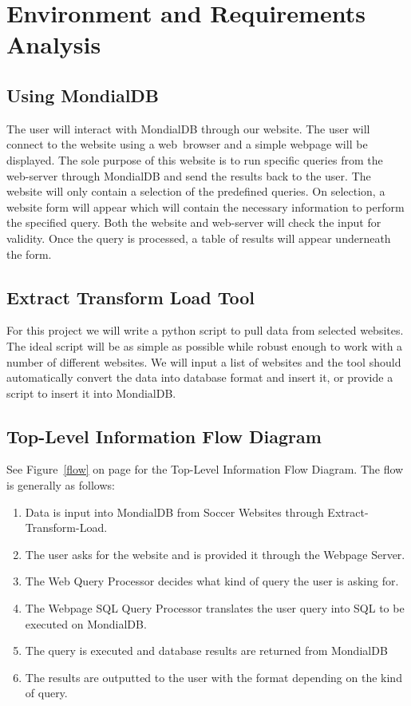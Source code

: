 \documentclass{article}
\begin{document}
\section{Environment and Requirements Analysis}

\subsection{Using MondialDB}
The user will interact with MondialDB through our website. The user will connect to the website using a web~browser and a simple webpage will be displayed. The sole purpose of this website is to run specific queries from the web-server through MondialDB and send the results back to the user. The website will only contain a selection of the predefined queries. On selection, a website form will appear which will contain the necessary information to perform the specified query. Both the website and web-server will check the input for validity. Once the query is processed, a table of results will appear underneath the form.

\subsection{Extract Transform Load Tool} 
For this project we will write a python script to pull data from selected websites. The ideal script will be as simple as possible while robust enough to work with a number of different websites. We will input a list of websites and the tool should automatically convert the data into database format and insert it, or provide a script to insert it into MondialDB.

\subsection{Top-Level Information Flow Diagram}
See Figure~\ref{flow} on page \pageref{flow} for the Top-Level Information Flow Diagram. The flow is generally as follows:

\begin{enumerate}
\item Data is input into MondialDB from Soccer Websites through Extract-Transform-Load. 
\item The user asks for the website and is provided it through the Webpage Server.
\item The Web Query Processor decides what kind of query the user is asking for.
\item The Webpage SQL Query Processor translates the user query into SQL to be executed on MondialDB.
\item The query is executed and database results are returned from MondialDB
\item The results are outputted to the user with the format depending on the kind of query.
\end{enumerate}
\end{document}
